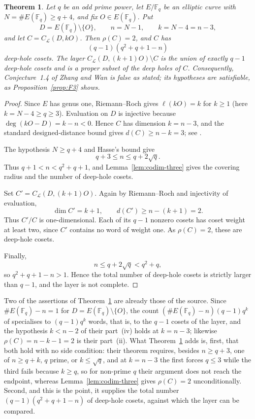 \documentclass[11pt]{amsart}
\newtheorem{theorem}{Theorem}
\newcommand{\F}{\mathbb{F}}
\newcommand{\CL}{C_{\mathcal L}}
\begin{document}
\begin{theorem}\label{thm:endpoint}
Let $q$ be an odd prime power, let $E/\F_q$ be an elliptic curve with
$N=\#E(\F_q)\ge q+4$, and fix $O\in E(\F_q)$. Put
\[
  D=E(\F_q)\setminus\{O\},\qquad n=N-1,\qquad k=N-4=n-3,
\]
and let $C=\CL(D,kO)$. Then $\rho(C)=2$, and $C$ has
\[
  (q-1)(q^2+q+1-n)
\]
deep-hole cosets. The layer $\CL(D,(k+1)O)\setminus C$ is the union of
exactly $q-1$ deep-hole cosets and is a proper subset of the deep holes
of $C$. Consequently, Conjecture~1.4 of Zhang and Wan is false as stated;
its hypotheses are satisfiable, as Proposition~\ref{prop:F3} shows.
\end{theorem}

\begin{proof}
Since $E$ has genus one, Riemann--Roch gives $\ell(kO)=k$ for $k\ge1$
(here $k=N-4\ge q\ge3$). Evaluation on
$D$ is injective because $\deg(kO-D)=k-n<0$. Hence $C$ has dimension
$k=n-3$, and the standard designed-distance bound gives $d(C)\ge n-k=3$;
see \cite[Chapter~2]{Stichtenoth}.

The hypothesis $N\ge q+4$ and Hasse's bound give
\[
  q+3\le n\le q+2\sqrt q.
\]
Thus $q+1<n<q^2+q+1$, and Lemma~\ref{lem:codim-three} gives the covering
radius and the number of deep-hole cosets.

Set $C'=\CL(D,(k+1)O)$. Again by Riemann--Roch and injectivity of
evaluation,
\[
  \dim C'=k+1,\qquad d(C')\ge n-(k+1)=2.
\]
Thus $C'/C$ is one-dimensional. Each of its $q-1$ nonzero cosets has
coset weight at least two, since $C'$ contains no word of weight one.
As $\rho(C)=2$, these are deep-hole cosets.

Finally,
\[
  n\le q+2\sqrt q<q^2+q,
\]
so $q^2+q+1-n>1$. Hence the total number of deep-hole cosets is strictly
larger than $q-1$, and the layer is not complete.
\end{proof}

Two of the assertions of Theorem~\ref{thm:endpoint} are already those of
the source. Since $\#E(\F_q)-n=1$ for $D=E(\F_q)\setminus\{O\}$, the
count $(\#E(\F_q)-n)(q-1)q^{k}$ of \cite[Theorem~1.2(iii)--(iv)]{ZhangWan}
specialises to $(q-1)q^{k}$ words, that is, to the $q-1$ cosets of the
layer, and the hypothesis $k<n-2$ of their part~(iv) holds at $k=n-3$;
likewise $\rho(C)=n-k-1=2$ is their part~(ii). What Theorem~\ref{thm:endpoint}
adds is, first, that both hold with no side condition: their theorem
requires, besides $n\ge q+3$, one of $n\ge q+k$, $q$ prime, or
$k\le\sqrt q$, and at $k=n-3$
the first forces $q\le3$ while the third fails because $k\ge q$, so for
non-prime $q$ their argument does not reach the endpoint, whereas
Lemma~\ref{lem:codim-three} gives $\rho(C)=2$ unconditionally. Second,
and this is the point, it supplies the total number
$(q-1)(q^2+q+1-n)$ of deep-hole cosets, against which the layer can be
compared.
\end{document}
